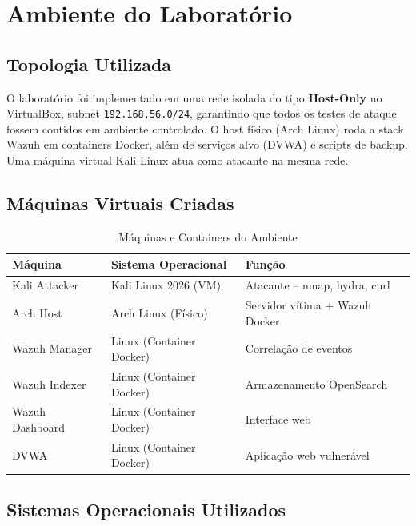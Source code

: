 \documentclass[12pt,a4paper]{article}
\begin{document}
    \newpage
    \section{Ambiente do Laboratório}

    \subsection{Topologia Utilizada}

    O laboratório foi implementado em uma rede isolada do tipo \textbf{Host-Only} no VirtualBox, subnet \texttt{192.168.56.0/24}, garantindo que todos os testes de ataque fossem contidos em ambiente controlado. O host físico (Arch Linux) roda a stack Wazuh em containers Docker, além de serviços alvo (DVWA) e scripts de backup. Uma máquina virtual Kali Linux atua como atacante na mesma rede.

    \subsection{Máquinas Virtuais Criadas}

    \begin{table}[htbp]
    \centering
    \caption{Máquinas e Containers do Ambiente}
    \begin{tabular}{lll}
    \toprule
    \textbf{Máquina} & \textbf{Sistema Operacional} & \textbf{Função} \\
    \midrule
    Kali Attacker & Kali Linux 2026 (VM) & Atacante -- nmap, hydra, curl \\
    Arch Host & Arch Linux (Físico) & Servidor vítima + Wazuh Docker \\
    Wazuh Manager & Linux (Container Docker) & Correlação de eventos \\
    Wazuh Indexer & Linux (Container Docker) & Armazenamento OpenSearch \\
    Wazuh Dashboard & Linux (Container Docker) & Interface web \\
    DVWA & Linux (Container Docker) & Aplicação web vulnerável \\
    \bottomrule
    \end{tabular}
    \end{table}

    \subsection{Sistemas Operacionais Utilizados}
\end{document}
